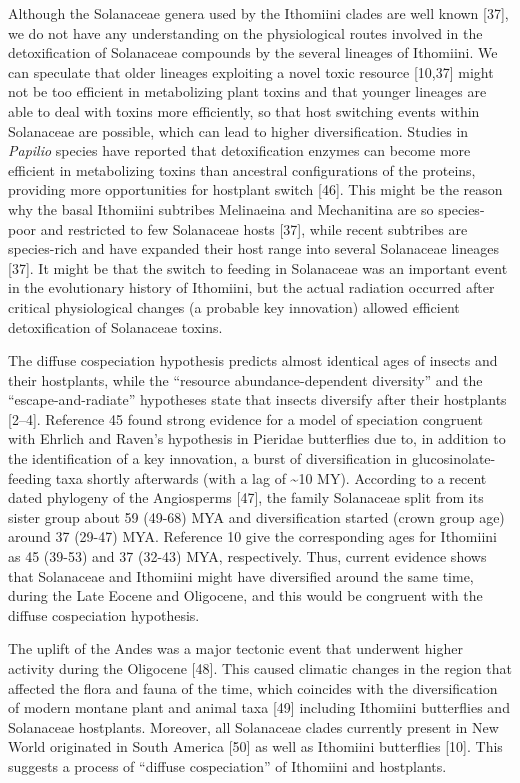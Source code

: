 \documentclass[10pt]{article}
\begin{document}
Although the Solanaceae genera used by the Ithomiini clades are well
known {[}37{]}, we do not have any understanding on the physiological
routes involved in the detoxification of Solanaceae compounds by the
several lineages of Ithomiini. We can speculate that older lineages
exploiting a novel toxic resource {[}10,37{]} might not be too efficient
in metabolizing plant toxins and that younger lineages are able to deal
with toxins more efficiently, so that host switching events within
Solanaceae are possible, which can lead to higher diversification.
Studies in \emph{Papilio} species have reported that detoxification
enzymes can become more efficient in metabolizing toxins than ancestral
configurations of the proteins, providing more opportunities for
hostplant switch {[}46{]}. This might be the reason why the basal
Ithomiini subtribes Melinaeina and Mechanitina are so species-poor and
restricted to few Solanaceae hosts {[}37{]}, while recent subtribes are
species-rich and have expanded their host range into several Solanaceae
lineages {[}37{]}. It might be that the switch to feeding in Solanaceae
was an important event in the evolutionary history of Ithomiini, but the
actual radiation occurred after critical physiological changes (a
probable key innovation) allowed efficient detoxification of Solanaceae
toxins.

The diffuse cospeciation hypothesis predicts almost identical ages of
insects and their hostplants, while the ``resource abundance-dependent
diversity'' and the ``escape-and-radiate'' hypotheses state that insects
diversify after their hostplants {[}2--4{]}. Reference 45 found strong
evidence for a model of speciation congruent with Ehrlich and Raven's
hypothesis in Pieridae butterflies due to, in addition to the
identification of a key innovation, a burst of diversification in
glucosinolate-feeding taxa shortly afterwards (with a lag of
\textasciitilde{}10 MY). According to a recent dated phylogeny of the
Angiosperms {[}47{]}, the family Solanaceae split from its sister group
about 59 (49-68) MYA and diversification started (crown group age)
around 37 (29-47) MYA. Reference 10 give the corresponding ages for
Ithomiini as 45 (39-53) and 37 (32-43) MYA, respectively. Thus, current
evidence shows that Solanaceae and Ithomiini might have diversified
around the same time, during the Late Eocene and Oligocene, and this
would be congruent with the diffuse cospeciation hypothesis.

The uplift of the Andes was a major tectonic event that underwent higher
activity during the Oligocene {[}48{]}. This caused climatic changes in
the region that affected the flora and fauna of the time, which
coincides with the diversification of modern montane plant and animal
taxa {[}49{]} including Ithomiini butterflies and Solanaceae hostplants.
Moreover, all Solanaceae clades currently present in New World
originated in South America {[}50{]} as well as Ithomiini butterflies
{[}10{]}. This suggests a process of ``diffuse cospeciation'' of
Ithomiini and hostplants.
\end{document}
